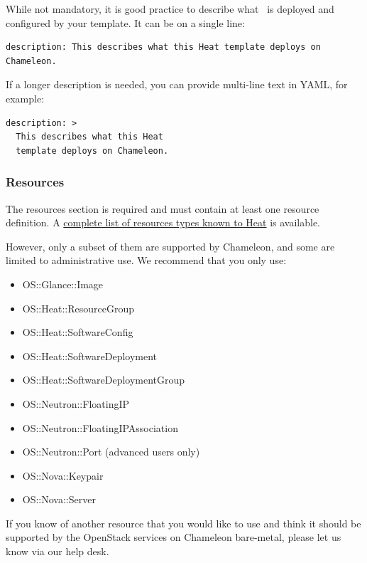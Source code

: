 While not mandatory, it is good practice to describe what ~is deployed
and configured by your template. It can be on a single line:

\begin{footnotesize}
\begin{verbatim}
description: This describes what this Heat template deploys on Chameleon.
\end{verbatim}
\end{footnotesize}

If a longer description is needed, you can provide multi-line text in
YAML, for example:

\begin{footnotesize}
\begin{verbatim}
description: >
  This describes what this Heat
  template deploys on Chameleon.
\end{verbatim}
\end{footnotesize}

\subsubsection{Resources}\label{resources}

The resources section is required and must contain at least one resource
definition. A
\href{http://docs.openstack.org/developer/heat/template_guide/openstack.html}{complete
list of resources types known to Heat} is available.

However, only a subset of them are supported by Chameleon, and some are
limited to administrative use. We recommend that you only use:

\begin{itemize}
\item
  OS::Glance::Image
\item
  OS::Heat::ResourceGroup
\item
  OS::Heat::SoftwareConfig
\item
  OS::Heat::SoftwareDeployment
\item
  OS::Heat::SoftwareDeploymentGroup
\item
  OS::Neutron::FloatingIP
\item
  OS::Neutron::FloatingIPAssociation
\item
  OS::Neutron::Port (advanced users only)
\item
  OS::Nova::Keypair
\item
  OS::Nova::Server
\end{itemize}

If you know of another resource that you would like to use and think it
should be supported by the OpenStack services on Chameleon bare-metal,
please let us know via our help desk.

